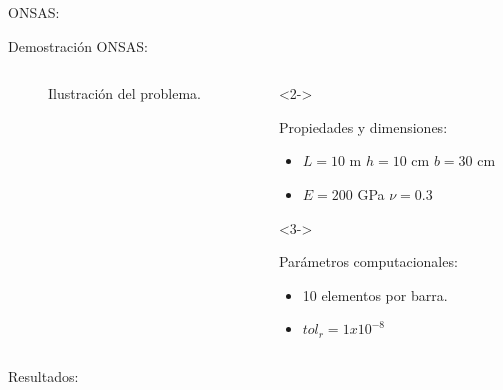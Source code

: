 \documentclass[
  aspectratio=169,
]{beamer}
\begin{document}
\begin{small}
\begin{frame}{ONSAS:}{}
\end{frame}
\begin{frame}[t]{Demostración ONSAS:}
	\begin{columns}[T,onlytextwidth]
		\begin{column}{.58\textwidth}
			\vspace{-1cm}
			\begin{figure}[htbp]
				\centering
				\def\svgwidth{50mm}
				
				\caption{Ilustración del problema.}
			\end{figure}
		\end{column}
		\begin{column}{.4\textwidth}
			\begin{onlyenv}<2->
				\begin{minipage}{\textwidth}
					\begin{block}{Propiedades y dimensiones:}
						\begin{itemize}
							\item $L = 10$ m $h=10$ cm $b=30$ cm
							\item $E = 200$ GPa  $\nu=0.3$ 
							\it
						\end{itemize}
					\end{block}
				\end{minipage}
			\end{onlyenv}
			\begin{onlyenv}<3->
				\begin{minipage}{\textwidth}
					\begin{block}{Parámetros computacionales:}
						\begin{itemize}
							\item 10 elementos por barra.
							\item $tol_r =1$$x10^{-8} $  
						\end{itemize}	 
					\end{block}
				\end{minipage}
			\end{onlyenv}
		\end{column}
	\end{columns}
\end{frame}

\begin{frame}{Resultados:}{}
	

\end{frame}
\end{small}
\end{document}
